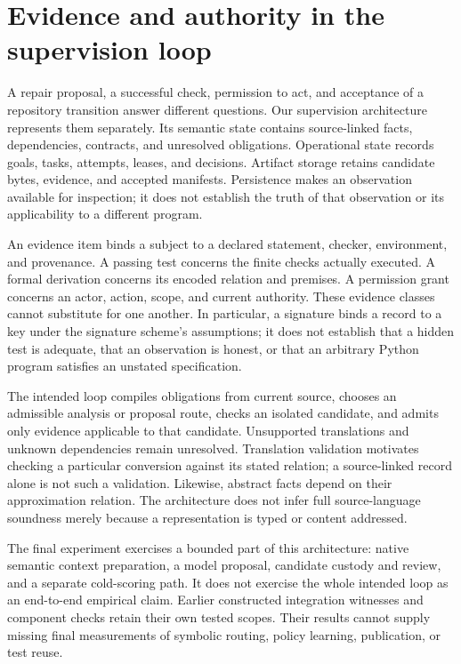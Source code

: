 
\section{Evidence and authority in the supervision loop}
\label{sec:evidence-boundaries}

A repair proposal, a successful check, permission to act, and acceptance of a
repository transition answer different questions. Our supervision architecture
represents them separately. Its semantic state contains source-linked facts,
dependencies, contracts, and unresolved obligations. Operational state records
goals, tasks, attempts, leases, and decisions. Artifact storage retains candidate
bytes, evidence, and accepted manifests. Persistence makes an observation
available for inspection; it does not establish the truth of that observation
or its applicability to a different program.

An evidence item binds a subject to a declared statement, checker, environment,
and provenance. A passing test concerns the finite checks actually executed.
A formal derivation concerns its encoded relation and premises. A permission
grant concerns an actor, action, scope, and current authority. These evidence
classes cannot substitute for one another. In particular, a signature binds a
record to a key under the signature scheme's assumptions; it does not establish
that a hidden test is adequate, that an observation is honest, or that an
arbitrary Python program satisfies an unstated specification.

The intended loop compiles obligations from current source, chooses an
admissible analysis or proposal route, checks an isolated candidate, and admits
only evidence applicable to that candidate. Unsupported translations and unknown
dependencies remain unresolved. Translation validation motivates checking a
particular conversion against its stated relation\citep{baseline04}; a
source-linked record alone is not such a validation. Likewise, abstract facts
depend on their approximation relation\citep{baseline02}. The architecture
does not infer full source-language soundness merely because a representation
is typed or content addressed.

The final experiment exercises a bounded part of this architecture: native
semantic context preparation, a model proposal, candidate custody and review,
and a separate cold-scoring path. It does not exercise the whole intended loop
as an end-to-end empirical claim. Earlier constructed integration witnesses and
component checks retain their own tested scopes. Their results cannot supply
missing final measurements of symbolic routing, policy learning, publication,
or test reuse.

